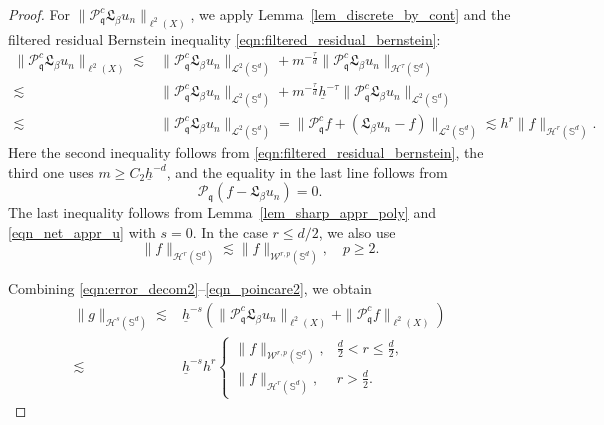 \documentclass{article}
\numberwithin{equation}{section}
\def\SS{\mathbb{S}}
\def\pc{\mathcal{P}^c}
\def\mq{\mathfrak{q}}
\begin{document}
\begin{proof}
\medskip
For $\|\pc_\mq\mathfrak L_\beta u_n\|_{\ell^2(X)}$, we apply Lemma~\ref{lem_discrete_by_cont} and the filtered residual Bernstein inequality \eqref{eqn:filtered_residual_bernstein}:
\begin{equation}\label{eqn_poincare2}
    \begin{split}
        \|\pc_\mq\mathfrak L_\beta u_n\|_{\ell^2(X)}
        \lesssim&\|\pc_\mq\mathfrak L_\beta u_n\|_{\mathcal L^2(\SS^d)}
        +m^{-\frac{\tau}{d}}\|\pc_\mq\mathfrak L_\beta u_n\|_{\mathcal H^\tau(\SS^d)}\\
        \lesssim&\|\pc_\mq\mathfrak L_\beta u_n\|_{\mathcal L^2(\SS^d)}
        +m^{-\frac{\tau}{d}}\underline h^{-\tau}
        \|\pc_\mq\mathfrak L_\beta u_n\|_{\mathcal L^2(\SS^d)}\\
        \lesssim&\|\pc_\mq\mathfrak L_\beta u_n\|_{\mathcal L^2(\SS^d)}=\|\pc_\mq f+(\mathfrak L_\beta u_n-f)\|_{\mathcal L^2(\SS^d)}
        \lesssim h^r\|f\|_{\mathcal H^r(\SS^d)}.
    \end{split}
\end{equation}
Here the second inequality follows from \eqref{eqn:filtered_residual_bernstein}, the third one uses $m\geq C_2\underline h^{-d}$, and the equality in the last line follows from
\begin{equation*}
    \mathcal P_\mq(f-\mathfrak L_\beta u_n)=0.
\end{equation*}
The last inequality follows from Lemma~\ref{lem_sharp_appr_poly} and \eqref{eqn_net_appr_u} with $s=0$. In the case $r\leq d/2$, we also use
\begin{equation*}
    \|f\|_{\mathcal H^r(\SS^d)}\lesssim\|f\|_{\mathcal W^{r,p}(\SS^d)},\quad p\geq2.
\end{equation*}

\medskip
Combining \eqref{eqn:error_decom2}--\eqref{eqn_poincare2}, we obtain
\begin{equation}
    \begin{split}
        \|g\|_{\mathcal H^s(\SS^d)}
        \lesssim&\underline h^{-s}\left(\|\pc_\mq\mathfrak L_\beta u_n\|_{\ell^2(X)}
        +\|\pc_\mq f\|_{\ell^2(X)}\right)\\
        \lesssim&\underline h^{-s}h^r
        \left\{\begin{array}{ll}
            \|f\|_{\mathcal W^{r,p}(\SS^d)},&\frac{d}{2}<r\leq\frac d2,\\[0.3em]
            \|f\|_{\mathcal H^r(\SS^d)},&r>\frac d2.
        \end{array}\right.
    \end{split}
\end{equation}


\end{proof}
\end{document}
